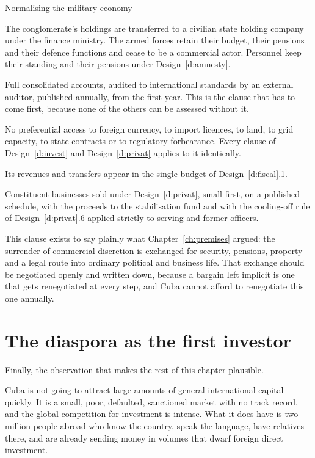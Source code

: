 \begin{design}{Normalising the military economy}
\label{d:gaesa}
\begin{rules}
 The conglomerate's holdings are transferred to a
civilian state holding company under the finance ministry. The armed forces
retain their budget, their pensions and their defence functions and cease to be a
commercial actor. Personnel keep their standing and their pensions under
Design~\ref{d:amnesty}.

 Full consolidated accounts, audited to
international standards by an external auditor, published annually, from the
first year. This is the clause that has to come first, because none of the others
can be assessed without it.

 No preferential access to foreign currency, to import
licences, to land, to grid capacity, to state contracts or to regulatory
forbearance. Every clause of Design~\ref{d:invest} and Design~\ref{d:privat}
applies to it identically.

 Its revenues and transfers appear in the single budget
of Design~\ref{d:fiscal}.1.

 Constituent businesses sold under
Design~\ref{d:privat}, small first, on a published schedule, with the proceeds to
the stabilisation fund and with the cooling-off rule of
Design~\ref{d:privat}.6 applied strictly to serving and former officers.

 This clause exists to say plainly what
Chapter~\ref{ch:premises} argued: the surrender of commercial discretion is
exchanged for security, pensions, property and a legal route into ordinary
political and business life. That exchange should be negotiated openly and
written down, because a bargain left implicit is one that gets renegotiated at
every step, and Cuba cannot afford to renegotiate this one annually.
\end{rules}
\end{design}

\section{The diaspora as the first investor}

Finally, the observation that makes the rest of this chapter plausible.

Cuba is not going to attract large amounts of general international capital
quickly. It is a small, poor, defaulted, sanctioned market with no track record,
and the global competition for investment is intense. What it does have is two
million people abroad who know the country, speak the language, have relatives
there, and are already sending money in volumes that dwarf foreign direct
investment.

